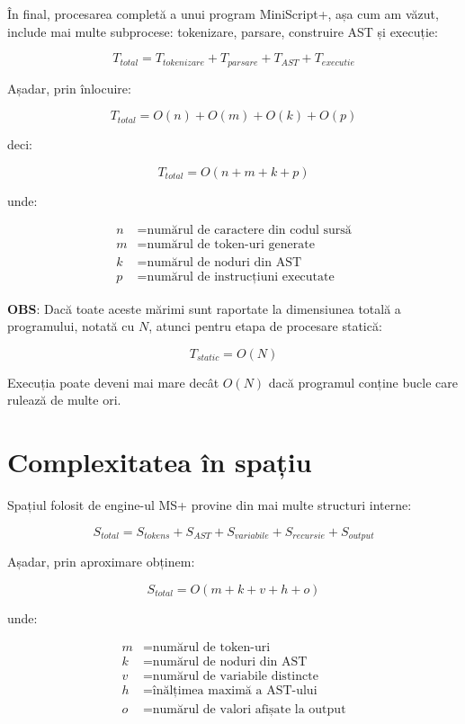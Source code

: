 \documentclass[12pt]{article}
\begin{document}
În final, procesarea completă a unui program MiniScript+, așa cum am văzut, include mai multe subprocese: tokenizare, parsare, construire AST și execuție:

\[
T_{total} =
T_{tokenizare} +
T_{parsare} +
T_{AST} +
T_{executie}
\]

Așadar, prin înlocuire:

\[
T_{total} = O(n) + O(m) + O(k) + O(p)
\]

deci:

\[
T_{total} = O(n + m + k + p)
\]

unde:

\[
\begin{aligned}
n &= \text{numărul de caractere din codul sursă} \\
m &= \text{numărul de token-uri generate} \\
k &= \text{numărul de noduri din AST} \\
p &= \text{numărul de instrucțiuni executate}
\end{aligned}
\]

\textbf{OBS}: Dacă toate aceste mărimi sunt raportate la dimensiunea totală a programului, notată cu \(N\), atunci pentru etapa de procesare statică:

\[
T_{static} = O(N)
\]

Execuția poate deveni mai mare decât \(O(N)\) dacă programul conține bucle care rulează de multe ori.

\section{Complexitatea în spațiu}

Spațiul folosit de engine-ul MS+ provine din mai multe structuri interne:

\[
S_{total} =
S_{tokens} +
S_{AST} +
S_{variabile} +
S_{recursie} +
S_{output}
\]

Așadar, prin aproximare obținem:

\[
S_{total} = O(m + k + v + h + o)
\]

unde:

\[
\begin{aligned}
m &= \text{numărul de token-uri} \\
k &= \text{numărul de noduri din AST} \\
v &= \text{numărul de variabile distincte} \\
h &= \text{înălțimea maximă a AST-ului} \\
o &= \text{numărul de valori afișate la output}
\end{aligned}
\]
\end{document}
